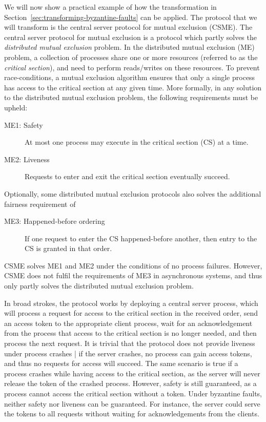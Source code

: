 \documentclass{article}
\begin{document}
		We will now show a practical example of how the transformation in Section~\ref{sec:transforming-byzantine-faults} can be applied.
		The protocol that we will transform is the central server protocol for mutual exclusion (CSME).
		The central server protocol for mutual exclusion is a protocol which partly solves the \textit{distributed mutual exclusion} problem.
		In the distributed mutual exclusion (ME) problem, a collection of processes share one or more resources (referred to as the \textit{critical section}), and need to perform reads/writes on these resources.
		To prevent race-conditions, a mutual exclusion algorithm ensures that only a single process has access to the critical section at any given time.
		More formally, in any solution to the distributed mutual exclusion problem, the following requirements must be upheld:
		\begin{description}
			\item[ME1: Safety] At most one process may execute in the critical section (CS) at a time.
			\item[ME2: Liveness] Requests to enter and exit the critical section eventually succeed.
		\end{description}
		Optionally, some distributed mutual exclusion protocols also solves the additional fairness requirement of
		\begin{description}
			\item[ME3: Happened-before ordering] If one request to enter the CS happened-before another, then entry to the CS is granted in that order.
		\end{description}
		CSME solves ME1 and ME2 under the conditions of no process failures.
		However, CSME does not fulfil the requirements of ME3 in asynchronous systems, and thus only partly solves the distributed mutual exclusion problem.

		In broad strokes, the protocol works by deploying a central server process, which will process a request for access to the critical section in the received order, send an access token to the appropriate client process, wait for an acknowledgement from the process that access to the critical section is no longer needed, and then process the next request.
		It is trivial that the protocol does not provide liveness under process crashes | if the server crashes, no process can gain access tokens, and thus no requests for access will succeed.
		The same scenario is true if a process crashes while having access to the critical section, as the server will never release the token of the crashed process.
		However, safety is still guaranteed, as a process cannot access the critical section without a token.
		Under byzantine faults, neither safety nor liveness can be guaranteed.
		For instance, the server could serve the tokens to all requests without waiting for acknowledgements from the clients.
\end{document}
